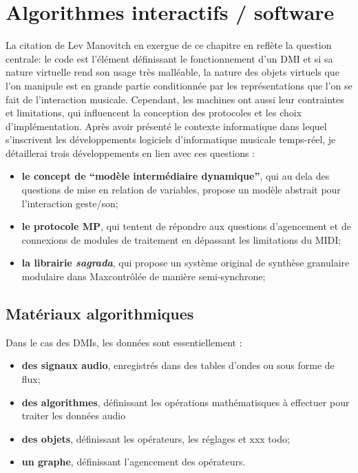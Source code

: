 %
\chapter{Algorithmes interactifs / software}
\label{ch:algorithms}



\noindent La citation de Lev Manovitch en exergue de ce chapitre en reflète la question centrale: le code est l'élément définissant le fonctionnement d'un \gls{DMI} et si sa nature virtuelle rend son usage très malléable, la nature des objets virtuels que l'on manipule est en grande partie conditionnée par les représentations que l'on se fait de l'interaction musicale. Cependant, les machines ont aussi leur contraintes et limitations, qui influencent la conception des protocoles et les choix d'implémentation. Après avoir présenté le contexte informatique dans lequel s'inscrivent les développements logiciels d'informatique musicale temps-réel, je détaillerai trois développements en lien avec ces questions : 
\vspace{-1em}
\begin{itemize}[noitemsep]
	\item \textbf{le concept de ``modèle intermédiaire dynamique''}, qui au dela des questions de mise en relation de variables, propose un modèle abstrait pour l'interaction geste/son;
	\item \textbf{le protocole MP}, qui tentent de répondre aux questions d'agencement et de connexions de modules de traitement en dépassant les limitations du MIDI;
	\item \textbf{la librairie \textit{sagrada}}, qui propose un système original de synthèse granulaire modulaire dans Maxcontrôlée de manière semi-synchrone;
\end{itemize}

\section{Matériaux algorithmiques}

\noindent Dans le cas des \glspl{DMI}, les données sont essentiellement :
\vspace{-1em}
\begin{itemize}[noitemsep]
	\item \textbf{des signaux audio}, enregistrés dans des tables d'ondes ou sous forme de flux;
	\item \textbf{des algorithmes}, définissant les opérations mathématisques à effectuer pour traiter les données audio
	\item \textbf{des objets}, définissant les opérateurs, les réglages et xxx todo;
	\item \textbf{un graphe}, définissant l'agencement des opérateurs.
\end{itemize}

